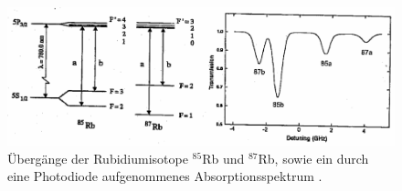 \begin{figure}[htb]
  \centering
	\includegraphics[width=\textwidth, angle=1, origin=c]{images/uebergaenge.pdf}
  \caption{Übergänge der Rubidiumisotope $^{85}$Rb und $^{87}$Rb, sowie ein durch
  eine Photodiode aufgenommenes Absorptionsspektrum \cite{anleitung}.}
  \label{fig:ueber}
\end{figure}
